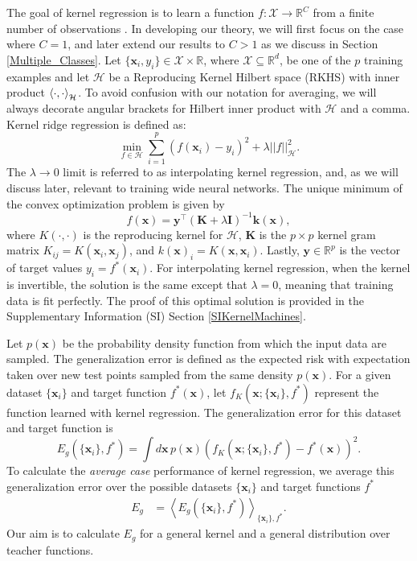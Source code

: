 \documentclass{article}
\begin{document}
The goal of kernel regression is to learn a function $f: \mathcal{X} \to \mathbb{R}^C$ from a finite number of observations \cite{Wahba90a,scholkopf_smola}. In developing our theory, we will first focus on the case where $C=1$, and later extend our results to $C>1$ as we discuss in Section \ref{Multiple_Classes}.   
Let $\{\mathbf{x}_i,y_i\} \in \mathcal{X}\times \mathbb{R}$, where $ \mathcal{X}\subseteq \mathbb{R}^{d}$, be one of the $p$ training examples and let $\mathcal{H}$ be a Reproducing Kernel Hilbert space (RKHS) with inner product $\braket{\cdot, \cdot}_{\mathcal{H}}$. To avoid confusion with our notation for averaging, we will always decorate angular brackets for Hilbert inner product with $\mathcal{H}$ and a comma. Kernel ridge regression is defined as: 
%
\begin{equation}\label{Kreg}
    \min_{f\in\mathcal{H}} \sum_{i=1}^p ( f(\mathbf{x}_i) - y_i)^2 + \lambda ||f||_{\mathcal{H}}^2.
\end{equation}
%
The $\lambda \to 0$ limit is referred to as interpolating kernel regression, and, as we will discuss later, relevant to training wide neural networks. The unique minimum of the convex optimization problem is given by
%
\begin{equation}\label{minfun}
    f(\mathbf{x}) = \mathbf{y}^\top (\mathbf{K}+\lambda \mathbf{I})^{-1} \mathbf{k}(\mathbf{x}),
\end{equation}
%
where $K(\cdot, \cdot)$ is the reproducing kernel for $\mathcal{H}$, $\mathbf{K}$ is the $p \times p$ kernel gram matrix $K_{ij} = K(\mathbf{x}_i,\mathbf{x}_j)$, and $k(\mathbf{x})_i = K(\mathbf{x}, \mathbf{x}_i)$. Lastly, $\mathbf{y} \in \mathbb{R}^p$ is the vector of target values ${y}_i = f^*(\mathbf{x}_i)$. For interpolating kernel regression, when the kernel is invertible, the solution is the same except that $\lambda = 0$, meaning that training data is fit perfectly. The proof of this optimal solution is provided in the Supplementary Information (SI) Section \ref{SIKernelMachines}. 

Let $p(\mathbf{x})$ be the probability density function from which the input data are sampled. The generalization error is defined as the expected risk with expectation taken over new test points sampled from the same density $p(\mathbf{x})$. For a given dataset $\{\mathbf{x}_i\}$ and target function $f^*(\mathbf{x})$, let $f_K(\mathbf{x}; \{\mathbf{x}_i\}, f^*)$ represent the function learned with kernel regression. The generalization error for this dataset and target function is
%
\begin{equation}
    E_g(\{\mathbf{x}_i\}, f^*) = \int d\mathbf{x}\,p(\mathbf{x}) \left(f_K(\mathbf{x}; \{\mathbf{x}_i\}, f^*) - f^*(\mathbf{x})  \right)^2. 
\end{equation}
%
To calculate the \textit{average case} performance of kernel regression, we average this generalization error over the possible datasets $\{\mathbf{x}_i \}$ and target functions $f^*$
%
\begin{align}\label{eq:Eg}
   E_g &= \left< E_g(\{\mathbf{x}_i\}, f^*) \right>_{\{\mathbf{x}_i\}, f^*}.
\end{align}
%
Our aim is to calculate $E_g$ for a general kernel and a general distribution over teacher functions. 
\end{document}
